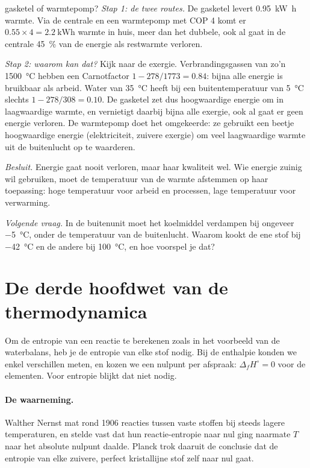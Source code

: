 \begin{casusuitgewerkt}{gasketel of warmtepomp?}
\emph{Stap 1: de twee routes.} De gasketel levert \SI{0.95}{\kilo\watt\hour} warmte. Via de centrale en een warmtepomp met COP 4 komt er $0.55 \times 4 = \SI{2.2}{\kilo\watt\hour}$ warmte in huis, meer dan het dubbele, ook al gaat in de centrale \SI{45}{\percent} van de energie als restwarmte verloren.

\emph{Stap 2: waarom kan dat?} Kijk naar de exergie. Verbrandingsgassen van zo'n \SI{1500}{\celsius} hebben een Carnotfactor $1 - 278/1773 = 0.84$: bijna alle energie is bruikbaar als arbeid. Water van \SI{35}{\celsius} heeft bij een buitentemperatuur van \SI{5}{\celsius} slechts $1 - 278/308 = 0.10$. De gasketel zet dus hoogwaardige energie om in laagwaardige warmte, en vernietigt daarbij bijna alle exergie, ook al gaat er geen energie verloren. De warmtepomp doet het omgekeerde: ze gebruikt een beetje hoogwaardige energie (elektriciteit, zuivere exergie) om veel laagwaardige warmte uit de buitenlucht op te waarderen.

\emph{Besluit.} Energie gaat nooit verloren, maar haar kwaliteit wel. Wie energie zuinig wil gebruiken, moet de temperatuur van de warmte afstemmen op haar toepassing: hoge temperatuur voor arbeid en processen, lage temperatuur voor verwarming.

\emph{Volgende vraag.} In de buitenunit moet het koelmiddel verdampen bij ongeveer \SI{-5}{\celsius}, onder de temperatuur van de buitenlucht. Waarom kookt de ene stof bij \SI{-42}{\celsius} en de andere bij \SI{100}{\celsius}, en hoe voorspel je dat?
\end{casusuitgewerkt}


\section{De derde hoofdwet van de thermodynamica}
\label{sec:derde-hoofdwet}

Om de entropie van een reactie te berekenen zoals in het voorbeeld van de waterbalans, heb je de entropie van elke stof nodig. Bij de enthalpie konden we enkel verschillen meten, en kozen we een nulpunt per afspraak: $\Delta_fH^\circ = 0$ voor de elementen. Voor entropie blijkt dat niet nodig.

\paragraph{De waarneming.} Walther Nernst mat rond 1906 reacties tussen vaste stoffen bij steeds lagere temperaturen, en stelde vast dat hun reactie-entropie naar nul ging naarmate $T$ naar het absolute nulpunt daalde. Planck trok daaruit de conclusie dat de entropie van elke zuivere, perfect kristallijne stof zelf naar nul gaat.

